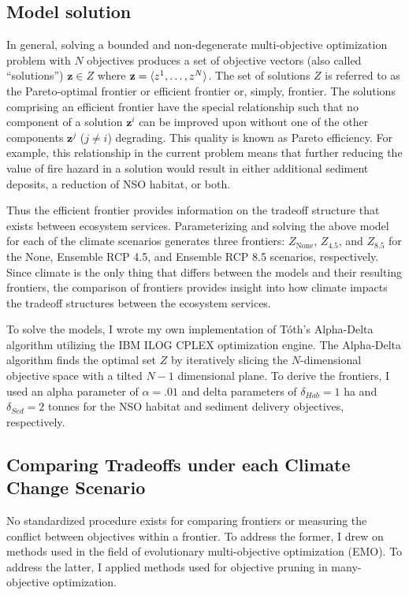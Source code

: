 \subsection{Model solution}
In general, solving a bounded and non-degenerate multi-objective optimization problem with $N$ objectives produces a set of objective vectors (also called ``solutions'') $\mathbf{z} \in Z$ where $\mathbf{z}=\braket{z^1,\ldots,z^N}$. The set of solutions $Z$ is referred to as the Pareto-optimal frontier or efficient frontier or, simply, frontier. The solutions comprising an efficient frontier have the special relationship such that no component of a solution $\mathbf{z}^i$ can be improved upon without one of the other components $\mathbf{z}^j$ ($j \neq i$) degrading. This quality is known as Pareto efficiency. For example, this relationship in the current problem means that further reducing the value of fire hazard in a solution would result in either additional sediment deposits, a reduction of NSO habitat, or both.

Thus the efficient frontier provides information on the tradeoff structure that exists between ecosystem services. Parameterizing and solving the above model for each of the climate scenarios generates three frontiers: $Z_{\text{None}}$, $Z_{4.5}$, and $Z_{8.5}$ for the None, Ensemble RCP 4.5, and Ensemble RCP 8.5 scenarios, respectively. Since climate is the only thing that differs between the models and their resulting frontiers, the comparison of frontiers provides insight into how climate impacts the tradeoff structures between the ecosystem services.

To solve the models, I wrote my own implementation of T\'{o}th's Alpha-Delta algorithm \cite{TothThesis} utilizing the IBM ILOG CPLEX optimization engine. The Alpha-Delta algorithm finds the optimal set $Z$ by iteratively slicing the $N$-dimensional objective space with a tilted $N-1$ dimensional plane. To derive the frontiers, I used an alpha parameter of $\alpha = .01$ and delta parameters of $\delta_{Hab} = 1$ ha and $\delta_{Sed} = 2$ tonnes for the NSO habitat and sediment delivery objectives, respectively.

\subsection{Comparing Tradeoffs under each Climate Change Scenario}

No standardized procedure exists for comparing frontiers or measuring the conflict between objectives within a frontier. To address the former, I drew on methods used in the field of evolutionary multi-objective optimization (EMO). To address the latter, I applied methods used for objective pruning in many-objective optimization.

